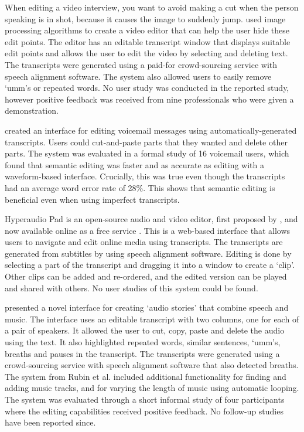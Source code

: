 When editing a video interview, you want to avoid making a cut when the person speaking is in shot, because it causes
the image to suddenly jump.  \citet{Berthouzoz2012} used image processing algorithms to create a video editor that can
help the user hide these edit points. The editor has an editable transcript window that displays suitable edit points
and allows the user to edit the video by selecting and deleting text. The transcripts were generated using a paid-for
crowd-sourcing service with speech alignment software. The system also allowed users to easily remove `umm's or
repeated words. No user study was conducted in the reported study, however positive feedback was received from nine
professionals who were given a demonstration.

\citet{Whittaker2004} created an interface for editing voicemail messages using automatically-generated transcripts.
Users could cut-and-paste parts that they wanted and delete other parts.  The system was evaluated in a formal study of
16 voicemail users, which found that semantic editing was faster and as accurate as editing with a waveform-based
interface. Crucially, this was true even though the transcripts had an average word error rate of 28\%. This shows that
semantic editing is beneficial even when using imperfect transcripts.

Hyperaudio Pad is an open-source audio and video editor, first proposed by \citet{Boas2011}, and now available online
as a free service \citep{Hyperaudio2016}. This is a web-based interface that allows users to navigate and edit online
media using transcripts. The transcripts are generated from subtitles by using speech alignment software. Editing is
done by selecting a part of the transcript and dragging it into a window to create a `clip'.  Other clips can be added
and re-ordered, and the edited version can be played and shared with others. No user studies of this system could be
found.

\citet{Rubin2013,Rubin2015} presented a novel interface for creating `audio stories' that combine speech and music. The
interface uses an editable transcript with two columns, one for each of a pair of speakers.  It allowed the user to
cut, copy, paste and delete the audio using the text. It also highlighted repeated words, similar sentences, `umm's,
breaths and pauses in the transcript. The transcripts were generated using a crowd-sourcing service with speech
alignment software that also detected breaths.  The system from Rubin et al. included additional functionality for
finding and adding music tracks, and for varying the length of music using automatic looping. The system was evaluated
through a short informal study of four participants where the editing capabilities received positive feedback. No
follow-up studies have been reported since.

